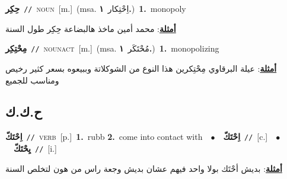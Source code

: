 \documentclass[10pt,a4paper,twoside]{article} %
\begin{document}
\begin{multicols}{2}
{\setlength\topsep{0pt}\textbf{\foreignlanguage{arabic}{حِكِر}}\ {\color{gray}\texttt{//}\color{black}}\ \textsc{noun}\ [m.]\ \color{gray}(msa. \foreignlanguage{arabic}{اِحْتِكار}~\foreignlanguage{arabic}{\textbf{١.}})\color{black}\ \textbf{1.}~monopoly\  \begin{flushright}\color{gray}\foreignlanguage{arabic}{\textbf{\underline{\foreignlanguage{arabic}{أمثلة}}}: محمد أمين ماخذ هالبضاعة حِكِر طول السنة}\end{flushright}\color{black}} \vspace{2mm}

{\setlength\topsep{0pt}\textbf{\foreignlanguage{arabic}{مِحْتِكِر}}\ {\color{gray}\texttt{//}\color{black}}\ \textsc{noun\textunderscore act}\ [m.]\ \color{gray}(msa. \foreignlanguage{arabic}{مُحْتَكَر}~\foreignlanguage{arabic}{\textbf{١.}})\color{black}\ \textbf{1.}~monopolizing\  \begin{flushright}\color{gray}\foreignlanguage{arabic}{\textbf{\underline{\foreignlanguage{arabic}{أمثلة}}}: عيلة البرقاوي مِحْتِكرين هذا النوع من الشوكلاتة وببيعوه بسعر كثير رخيص ومناسب للجميع}\end{flushright}\color{black}} \vspace{2mm}

\vspace{-3mm}
\subsection*{\color{blue}\foreignlanguage{arabic}{ح.ك.ك}\color{blue}{}} 

{\setlength\topsep{0pt}\textbf{\foreignlanguage{arabic}{اِحْتَكّ}}\ {\color{gray}\texttt{//}\color{black}}\ \textsc{verb}\ [p.]\ \textbf{1.}~rubb  \textbf{2.}~come into contact with\ \ $\bullet$\ \ \setlength\topsep{0pt}\textbf{\foreignlanguage{arabic}{اِحْتَكّ}}\ {\color{gray}\texttt{//}\color{black}}\ [c.]\ \ $\bullet$\ \ \setlength\topsep{0pt}\textbf{\foreignlanguage{arabic}{يِحْتَكّ}}\ {\color{gray}\texttt{//}\color{black}}\ [i.]\  \begin{flushright}\color{gray}\foreignlanguage{arabic}{\textbf{\underline{\foreignlanguage{arabic}{أمثلة}}}: بديش أحْتَك بولا واحد فيهم عشان بديش وجعة راس من هون لتخلص السنة}\end{flushright}\color{black}} \vspace{2mm}


\end{multicols}
\end{document}
